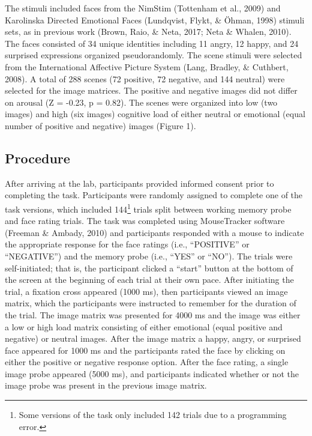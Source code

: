 \documentclass[man]{apa6}
\let\rmarkdownfootnote\footnote%
\def\footnote{\protect\rmarkdownfootnote}
\begin{document}
The stimuli included faces from the NimStim (Tottenham et al., 2009) and Karolinska Directed Emotional Faces (Lundqvist, Flykt, \& Öhman, 1998) stimuli sets, as in previous work (Brown, Raio, \& Neta, 2017; Neta \& Whalen, 2010). The faces consisted of 34 unique identities including 11 angry, 12 happy, and 24 surprised expressions organized pseudorandomly. The scene stimuli were selected from the International Affective Picture System (Lang, Bradley, \& Cuthbert, 2008). A total of 288 scenes (72 positive, 72 negative, and 144 neutral) were selected for the image matrices. The positive and negative images did not differ on arousal (Z = -0.23, p = 0.82). The scenes were organized into low (two images) and high (six images) cognitive load of either neutral or emotional (equal number of positive and negative) images (Figure 1).

\hypertarget{procedure}{%
\subsection{Procedure}\label{procedure}}

After arriving at the lab, participants provided informed consent prior to completing the task. Participants were randomly assigned to complete one of the task versions, which included 144\footnote{Some versions of the task only included 142 trials due to a programming error.} trials split between working memory probe and face rating trials. The task was completed using MouseTracker software (Freeman \& Ambady, 2010) and participants responded with a mouse to indicate the appropriate response for the face ratings (i.e., \enquote{POSITIVE} or \enquote{NEGATIVE}) and the memory probe (i.e., \enquote{YES} or \enquote{NO}). The trials were self-initiated; that is, the participant clicked a \enquote{start} button at the bottom of the screen at the beginning of each trial at their own pace. After initiating the trial, a fixation cross appeared (1000 ms), then participants viewed an image matrix, which the participants were instructed to remember for the duration of the trial. The image matrix was presented for 4000 ms and the image was either a low or high load matrix consisting of either emotional (equal positive and negative) or neutral images. After the image matrix a happy, angry, or surprised face appeared for 1000 ms and the participants rated the face by clicking on either the positive or negative response option. After the face rating, a single image probe appeared (5000 ms), and participants indicated whether or not the image probe was present in the previous image matrix.
\end{document}
